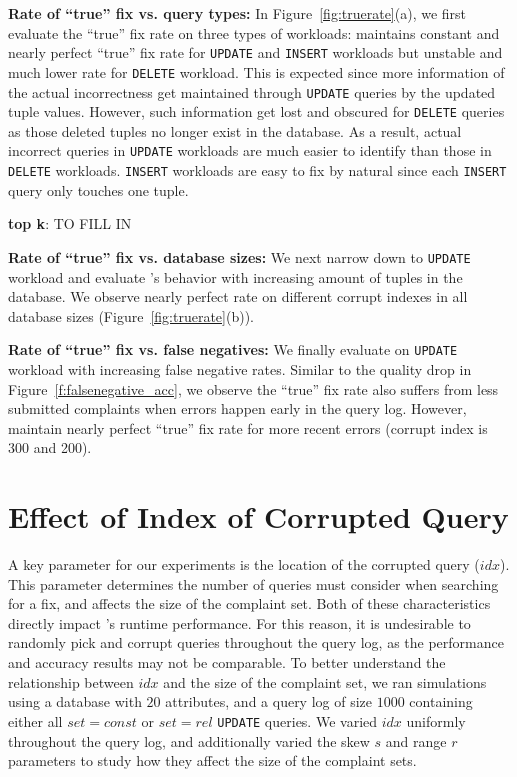 \textbf{Rate of ``true'' fix vs. query types: } In Figure~\ref{fig:truerate}(a), we first evaluate the ``true'' fix rate on three types of workloads: \sys maintains constant and 
nearly perfect ``true'' fix rate for \texttt{UPDATE} and \texttt{INSERT} workloads but unstable and much lower rate for \texttt{DELETE} workload. This is expected since more information of the actual incorrectness get maintained through \texttt{UPDATE} queries by the updated tuple values. However, such information get lost and obscured for \texttt{DELETE} queries as those deleted tuples no longer exist in the database. As a result, actual incorrect queries in \texttt{UPDATE} workloads are much easier to identify than those in \texttt{DELETE} workloads. \texttt{INSERT} workloads are easy to fix by natural since each \texttt{INSERT} query only touches one tuple. 

\textbf{top k}: TO FILL IN


\textbf{Rate of ``true'' fix vs. database sizes: } We next narrow down to \texttt{UPDATE} workload and evaluate \sys's behavior with increasing amount of tuples in the database. We observe nearly perfect rate on different corrupt indexes in all database sizes (Figure~\ref{fig:truerate}(b)). 

\textbf{Rate of ``true'' fix vs. false negatives: } We finally evaluate \sys on \texttt{UPDATE} workload with increasing false negative rates. Similar to the quality drop in Figure~\ref{f:falsenegative_acc}, we observe the ``true'' fix rate also suffers from less submitted complaints when errors happen early in the query log. However, \sys maintain nearly perfect ``true'' fix rate for more recent errors (corrupt index is 300 and 200). 


\section{Effect of Index of Corrupted Query}
\label{app:qidx}


A key parameter for our experiments is the location of the corrupted query ($idx$).  
This parameter determines the number of queries \sys must consider when searching for a fix,
and affects the size of the complaint set.  
Both of these characteristics directly impact \sys's 
runtime performance. For this reason, it is undesirable to randomly pick and corrupt queries
throughout the query log, as the performance and accuracy results may not be comparable. 
To better understand the relationship between $idx$ and the size of the complaint set, we ran
simulations using a database with $20$ attributes, and a query log of size $1000$ containing
either all $set = const$ or $set = rel$ \texttt{UPDATE} queries.
We varied  $idx$ uniformly throughout the query log, and additionally varied
the skew $s$ and range $r$ parameters to study how they affect the size of the complaint sets.


